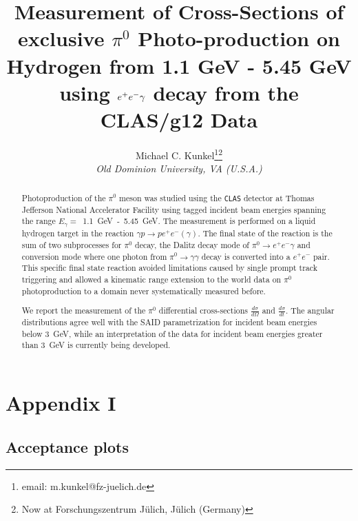 \documentclass[11pt,a4paper]{article}
\title{Measurement of Cross-Sections of exclusive $\pi^{0}$ Photo-production on Hydrogen from 1.1 GeV - 5.45 GeV using $\lowercase{e}^{+}\lowercase{e}^{-}\gamma$ decay from the CLAS/g12 Data}
\date{}
\author{Michael C. Kunkel\thanks{email: m.kunkel@fz-juelich.de}\thanks{Now at Forschungszentrum J\"ulich, J\"ulich (Germany)} \\ \vspace{0.3cm} \it \qquad Old Dominion University, VA (U.S.A.) \newline \newline}
\begin{document}
	\setcounter{page}{3}
%	
	\maketitle
	\thispagestyle{firststyle}
\begin{abstract}
	Photoproduction of the $\pi^0$ meson was studied using the \textsc{\texttt{CLAS}} detector at Thomas Jefferson National Accelerator Facility using tagged incident beam energies spanning the range $E_{\gamma}=$~1.1~GeV~-~5.45~GeV. The measurement is performed on a liquid hydrogen target in the reaction $\gamma p\to pe^+e^-(\gamma)$. The final state of the reaction is the sum of two subprocesses for $\pi^0$ decay, the Dalitz decay mode of $\pi^0\to e^+e^-\gamma$ and conversion mode where one photon from $\pi^0\to \gamma\gamma$ decay is converted into a $e^+e^-$ pair. This specific final state reaction avoided limitations caused by single prompt track triggering and allowed a kinematic range extension to the world data on $\pi^0$ photoproduction to a domain never systematically measured before.
	
	We report the measurement of the $\pi^0$ differential cross-sections $\frac{d\sigma}{d\Omega}$ and $\frac{d\sigma}{dt}$. The angular distributions agree well with the SAID parametrization for incident beam energies below 3~GeV, while an interpretation of the data for incident beam energies greater than 3~GeV is currently being developed.
\end{abstract}
	\newpage
	\tableofcontents
	\newpage
	
	
	
	
	
	
    

	

	
	\newpage
	\clearpage
	
		
	
\section{Appendix I}
\subsection{Acceptance plots} \label{sec:Appen}

\end{document}
